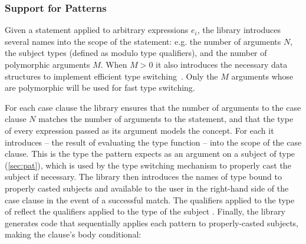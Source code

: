 
\subsubsection{Support for Patterns}
\label{sec:patcases}

Given a statement  applied to arbitrary expressions $e_i$, the library introduces several 
names into the scope of the statement: e.g. the number of arguments $N$, the subject 
types  (defined as  modulo type 
qualifiers), and the number of polymorphic arguments $M$. When $M > 0$ it also 
introduces the necessary data structures to implement efficient type 
switching~\cite{TS12}. Only the $M$ arguments whose  are 
polymorphic will be used for fast type switching.

For each case clause  the library ensures that the 
number of arguments to the case clause $N$ matches the number of arguments to 
the  statement, and that the type  of every expression 
 passed as its argument models the  concept. 
For each  it introduces  -- 
the result of evaluating the type function  --
into the scope of the case clause.
This is the type the pattern 
expects as an argument on a subject of type  (\textsection\ref{sec:pat}), 
which is used by the type switching mechanism to properly cast the subject if necessary. 
The library then introduces the names  of type  
bound to properly casted subjects and available to the user in the right-hand 
side of the case clause in the event of a successful match. The qualifiers applied to 
the type of  reflect the qualifiers applied to the type of the subject 
. Finally, the library generates code that sequentially applies 
each pattern to properly-casted subjects, making the clause's body conditional:

